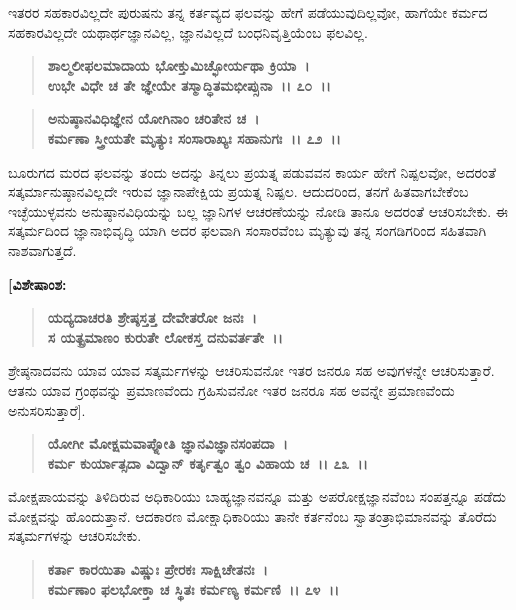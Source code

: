 ಇತರರ ಸಹಕಾರವಿಲ್ಲದೇ ಪುರುಷನು ತನ್ನ ಕರ್ತವ್ಯದ ಫಲವನ್ನು ಹೇಗೆ ಪಡೆಯುವುದಿಲ್ಲವೋ, ಹಾಗೆಯೇ ಕರ್ಮದ ಸಹಕಾರವಿಲ್ಲದೇ ಯಥಾರ್ಥಜ್ಞಾನವಿಲ್ಲ, ಜ್ಞಾನವಿಲ್ಲದೆ ಬಂಧನಿವೃತ್ತಿಯೆಂಬ ಫಲವಿಲ್ಲ.

\begin{verse}
\textbf{ಶಾಲ್ಮಲೀಫಲಮಾದಾಯ ಭೋಕ್ತುಮಿಚ್ಛೋರ್ಯಥಾ ಕ್ರಿಯಾ~।}\\\textbf{ಉಭೇ ವಿಧೇ ಚ ತೇ ಜ್ಞೇಯೇ ತಸ್ಮಾದ್ಧಿತಮಭೀಪ್ಸುನಾ~।। ೭೦~।। }
\end{verse}

\begin{verse}
\textbf{ಅನುಷ್ಠಾನವಿಧಿಜ್ಞೇನ ಯೋಗಿನಾಂ ಚರಿತೇನ ಚ~।}\\\textbf{ಕರ್ಮಣಾ ಸ್ತ್ರೀಯತೇ ಮೃತ್ಯುಃ ಸಂಸಾರಾಖ್ಯಃ ಸಹಾನುಗಃ~।। ೭೨~।।}
\end{verse}

ಬೂರುಗದ ಮರದ ಫಲವನ್ನು ತಂದು ಅದನ್ನು ತಿನ್ನಲು ಪ್ರಯತ್ನ ಪಡುವವನ ಕಾರ್ಯ ಹೇಗೆ ನಿಷ್ಪಲವೋ, ಅದರಂತೆ ಸತ್ಕರ್ಮಾನುಷ್ಠಾನವಿಲ್ಲದೇ ಇರುವ ಜ್ಞಾನಾಪೇಕ್ಷಿಯ ಪ್ರಯತ್ನ ನಿಷ್ಪಲ. ಆದುದರಿಂದ, ತನಗೆ ಹಿತವಾಗಬೇಕೆಂಬ ಇಚ್ಛೆಯುಳ್ಳವನು ಅನುಷ್ಠಾನವಿಧಿಯನ್ನು ಬಲ್ಲ ಜ್ಞಾನಿಗಳ ಆಚರಣೆಯನ್ನು ನೋಡಿ ತಾನೂ ಅದರಂತೆ ಆಚರಿಸಬೇಕು. ಈ ಸತ್ಕರ್ಮದಿಂದ ಜ್ಞಾನಾಭಿವೃದ್ಧಿ ಯಾಗಿ ಅದರ ಫಲವಾಗಿ ಸಂಸಾರವೆಂಬ ಮೃತ್ಯುವು ತನ್ನ ಸಂಗಡಿಗರಿಂದ ಸಹಿತವಾಗಿ ನಾಶವಾಗುತ್ತದೆ.

\textbf{[ವಿಶೇಷಾಂಶ:}

\begin{verse}
\textbf{ಯದ್ಯದಾಚರತಿ ಶ್ರೇಷ್ಠಸ್ತತ್ತ ದೇವೇತರೋ ಜನಃ~।}\\\textbf{ಸ ಯತ್ಪ್ರಮಾಣಂ ಕುರುತೇ ಲೋಕಸ್ತ ದನುವರ್ತತೇ~।।} 
\end{verse}

ಶ್ರೇಷ್ಠನಾದವನು ಯಾವ ಯಾವ ಸತ್ಕರ್ಮಗಳನ್ನು ಆಚರಿಸುವನೋ ಇತರ ಜನರೂ ಸಹ ಅವುಗಳನ್ನೇ ಆಚರಿಸುತ್ತಾರೆ. ಆತನು ಯಾವ ಗ್ರಂಥವನ್ನು ಪ್ರಮಾಣವೆಂದು ಗ್ರಹಿಸುವನೋ ಇತರ ಜನರೂ ಸಹ ಅವನ್ನೇ ಪ್ರಮಾಣವೆಂದು ಅನುಸರಿಸುತ್ತಾರೆ].

\begin{verse}
\textbf{ಯೋಗೀ ಮೋಕ್ಷಮವಾಪ್ನೋತಿ ಜ್ಞಾನವಿಜ್ಞಾನಸಂಪದಾ~।}\\\textbf{ಕರ್ಮ ಕುರ್ಯಾತ್ಸದಾ ವಿದ್ವಾನ್ ಕರ್ತೃತ್ವಂ ತ್ವಂ ವಿಹಾಯ ಚ~।। ೭೩~।।}
\end{verse}

ಮೋಕ್ಷಪಾಯವನ್ನು ತಿಳಿದಿರುವ ಅಧಿಕಾರಿಯು ಬಾಹ್ಯಜ್ಞಾನವನ್ನೂ ಮತ್ತು ಅಪರೋಕ್ಷ\-ಜ್ಞಾನವೆಂಬ ಸಂಪತ್ತನ್ನೂ ಪಡೆದು ಮೋಕ್ಷವನ್ನು ಹೊಂದುತ್ತಾನೆ. ಆದಕಾರಣ ಮೋಕ್ಷಾಧಿಕಾರಿಯು ತಾನೇ ಕರ್ತನೆಂಬ ಸ್ವಾತಂತ್ರಾಭಿಮಾನವನ್ನು ತೊರೆದು ಸತ್ಕರ್ಮಗಳನ್ನು ಆಚರಿಸಬೇಕು.

\begin{verse}
\textbf{ಕರ್ತಾ ಕಾರಯಿತಾ ವಿಷ್ಣುಃ ಪ್ರೇರಕಃ ಸಾಕ್ಷಿಚೇತನಃ~।}\\\textbf{ಕರ್ಮಣಾಂ ಫಲಭೋಕ್ತಾ ಚ ಸ್ಥಿತಃ ಕರ್ಮಣ್ಯ ಕರ್ಮಣಿ~।। ೭೪~।।}
\end{verse}


